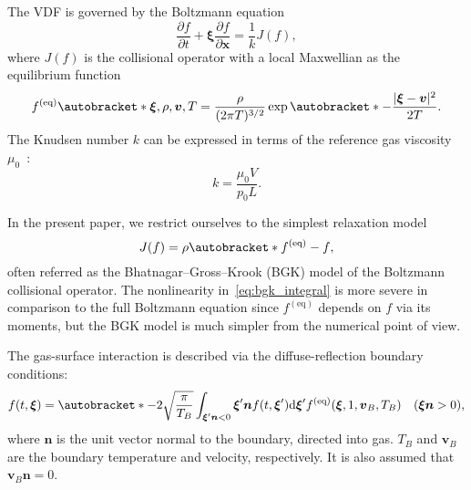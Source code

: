 \documentclass[]{elsarticle} %
\newcommand{\dd}{\mathrm{d}}
\newcommand{\pder}[2][]{\frac{\partial#1}{\partial#2}}
\DeclarePairedDelimiter\autobracket()       %
\newcommand{\br}[1]{\autobracket*{#1}}
\newcommand{\dxi}{\dd{\boldsymbol{\xi}}}
\newcommand{\bxi}{\boldsymbol{\xi}}
\newcommand{\bv}{\boldsymbol{v}}
\newcommand{\bn}{\boldsymbol{n}}
\newcommand{\bx}{\boldsymbol{x}}
\newcommand{\equil}[1]{#1^\mathrm{(eq)}}
\newcommand{\refer}[1]{#1_0}
\begin{document}
The VDF is governed by the Boltzmann equation
\begin{equation}\label{eq:Boltzmann}
    \pder[f]{t} + \bxi\pder[f]{\bx} = \frac1kJ(f),
\end{equation}
where \(J(f)\) is the collisional operator with a local Maxwellian as the equilibrium function
\begin{equation}\label{eq:equilibrium}
    \equil{f}\br{\bxi,\rho,\bv,T} = \frac{\rho}{(2\pi T)^{3/2}}\exp\br{-\frac{|\bxi-\bv|^2}{2T}}.
\end{equation}
The Knudsen number \(k\) can be expressed in terms of the reference gas viscosity \(\refer\mu\)~\cite{Sharipov1998}:
\begin{equation}\label{eq:Knudsen_number}
    k = \frac{\refer\mu V}{\refer{p}L}.
\end{equation}

In the present paper, we restrict ourselves to the simplest relaxation model~\cite{Krook1954, Welander1954}
\begin{equation}\label{eq:bgk_integral}
    J(f) = \rho\br{\equil{f}-f},
\end{equation}
often referred as the Bhatnagar--Gross--Krook (BGK) model of the Boltzmann collisional operator.
The nonlinearity in~\eqref{eq:bgk_integral} is more severe in comparison to the full Boltzmann equation
since \(\equil{f}\) depends on \(f\) via its moments,
but the BGK model is much simpler from the numerical point of view.

The gas-surface interaction is described via the diffuse-reflection boundary conditions:
\begin{equation}\label{eq:diffuse}
    f(t,\bxi) = \br{-2\sqrt\frac\pi{T_B} \int_{\bxi'\bn<0} \bxi'\bn f(t,\bxi')\dxi'}
        \equil{f}(\bxi,1,\bv_B,T_B) \quad (\bxi\bn>0),
\end{equation}
where \(\bn\) is the unit vector normal to the boundary, directed into gas.
\(T_B\) and \(\bv_B\) are the boundary temperature and velocity, respectively.
It is also assumed that \(\bv_B\bn = 0\).
\end{document}
